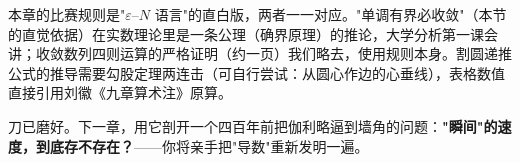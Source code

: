 \begin{chengshi}
本章的比赛规则是"$\varepsilon$--$N$ 语言"的直白版，两者一一对应。"单调有界必收敛"（本节的直觉依据）在实数理论里是一条公理（确界原理）的推论，大学分析第一课会讲；收敛数列四则运算的严格证明（约一页）我们略去，使用规则本身。割圆递推公式的推导需要勾股定理两连击（可自行尝试：从圆心作边的心垂线），表格数值直接引用刘徽《九章算术注》原算。
\end{chengshi}

刀已磨好。下一章，用它剖开一个四百年前把伽利略逼到墙角的问题：\textbf{"瞬间"的速度，到底存不存在？}——你将亲手把"导数"重新发明一遍。
